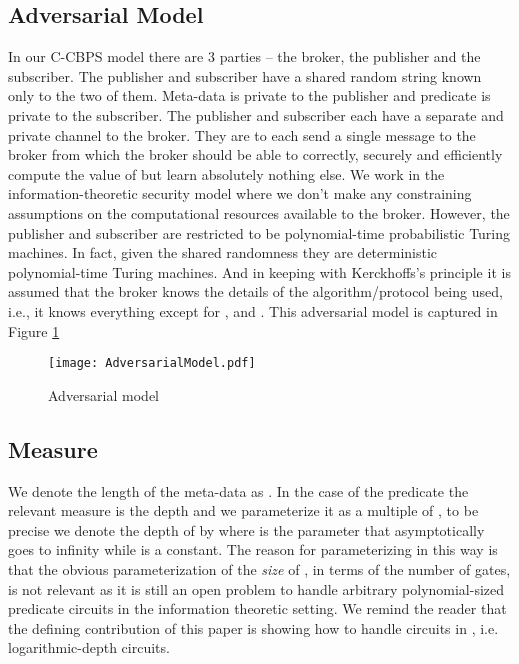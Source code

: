 \subsection{Adversarial Model}
In our C-CBPS  model there are 3 parties --  the broker, the publisher
and the subscriber.  The publisher and subscriber have a shared random
string  known only to the  two of them. Meta-data  is private
to the  publisher and predicate   is private to  the subscriber.
The publisher and subscriber each  have a separate and private channel
to the  broker. They are to each  send a single message  to the broker
from  which the  broker  should  be able  to  correctly, securely  and
efficiently  compute the  value of   but  learn absolutely
nothing  else. We  work  in the  information-theoretic security  model
where we don't make  any constraining assumptions on the computational
resources  available  to  the  broker.   However,  the  publisher  and
subscriber are  restricted to be  polynomial-time probabilistic Turing
machines. In fact, given  the shared randomness they are deterministic
polynomial-time  Turing  machines. And  in  keeping with  Kerckhoffs's
principle \cite{Kerckhoff1883} it is assumed that the broker knows the
details  of   the  algorithm/protocol  being  used,   i.e.,  it  knows
everything except for ,   and .  This adversarial model
is captured in Figure \ref{fig:adversarialmodel}

\begin{figure}
\centering
\texttt{[image: AdversarialModel.pdf]}
\vspace{-.5in}
\caption{Adversarial model}
\label{fig:adversarialmodel}
\end{figure}

\subsection{Measure}
We denote the  length of the meta-data  as . In the
case of the predicate  the  relevant measure is the depth and we
parameterize it as a multiple of  , to be precise we denote the
depth  of   by  where   is  the  parameter that
asymptotically  goes to  infinity while   is  a  constant. The
reason   for  parameterizing  in   this  way   is  that   the  obvious
parameterization of the  {\em size} of , in  terms of the number
of gates,  is not relevant  as it is  still an open problem  to handle
arbitrary  polynomial-sized  predicate  circuits  in  the  information
theoretic setting. We remind the reader that the defining contribution
of  this  paper   is  showing  how  to  handle   circuits  in  \NCone,
i.e. logarithmic-depth circuits.

